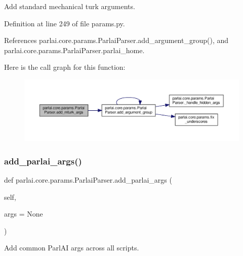\begin{DoxyVerb}Add standard mechanical turk arguments.\end{DoxyVerb}
 

Definition at line 249 of file params.\+py.



References parlai.\+core.\+params.\+Parlai\+Parser.\+add\+\_\+argument\+\_\+group(), and parlai.\+core.\+params.\+Parlai\+Parser.\+parlai\+\_\+home.

Here is the call graph for this function\+:
\nopagebreak
\begin{figure}[H]
\begin{center}
\leavevmode
\includegraphics[width=350pt]{classparlai_1_1core_1_1params_1_1ParlaiParser_a6043b5b5c36f99f85a9791dd8dc35551_cgraph}
\end{center}
\end{figure}
\mbox{\label{classparlai_1_1core_1_1params_1_1ParlaiParser_a3dfaa7781346d8c974d60684e81cb705}} 
\subsubsection{\texorpdfstring{add\+\_\+parlai\+\_\+args()}{add\_parlai\_args()}}
{\footnotesize\ttfamily def parlai.\+core.\+params.\+Parlai\+Parser.\+add\+\_\+parlai\+\_\+args (\begin{DoxyParamCaption}\item[{}]{self,  }\item[{}]{args = {\ttfamily None} }\end{DoxyParamCaption})}

\begin{DoxyVerb}Add common ParlAI args across all scripts.\end{DoxyVerb}
 

